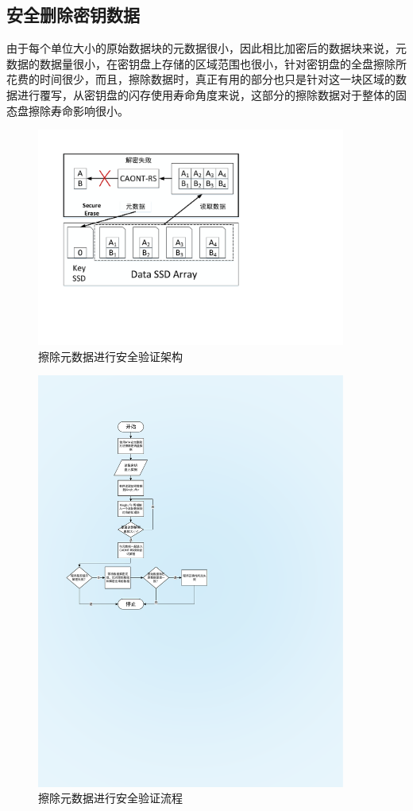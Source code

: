 \subsection{安全删除密钥数据}
由于每个单位大小的原始数据块的元数据很小，因此相比加密后的数据块来说，元数据的数据量很小，在密钥盘上存储的区域范围也很小，针对密钥盘的全盘擦除所花费的时间很少，而且，擦除数据时，真正有用的部分也只是针对这一块区域的数据进行覆写，从密钥盘的闪存使用寿命角度来说，这部分的擦除数据对于整体的固态盘擦除寿命影响很小。
\begin{figure}[H]
	\centering
	\includegraphics[width=4in]{Pics/del-key-st.pdf}
	\caption{擦除元数据进行安全验证架构}\label{fig:13}
\end{figure}
\begin{figure}[H]
	\centering
	\includegraphics[width=4in]{Pics/del-key-pr.pdf}
	\caption{擦除元数据进行安全验证流程}\label{fig:14}
\end{figure}
